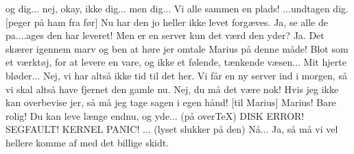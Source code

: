 \documentclass[a4paper,11pt]{article}
\begin{document}
\begin{sketch}
   og dig... nej, okay, ikke dig... men dig... Vi alle sammen en plads!
   ...undtagen dig. [peger på ham fra før]
 Nu har den jo heller ikke levet forgæves.
 Ja, se alle de pa....ages den har leveret!
 Men er en server kun det værd den yder?
 Ja.
 Det skærer igennem marv og ben at høre jer omtale Marius på denne måde!
   Blot som et værktøj, for at levere en vare, og ikke et følende, tænkende væsen...
   Mit hjerte bløder...   
 Nej, vi har altså ikke tid til det her. Vi får en ny server ind i morgen, så
    vi skal altså have fjernet den gamle nu.
 Nej, du må det være nok! Hvis jeg ikke kan overbevise jer, så må jeg
   tage sagen i egen hånd!
[til Marius] Marius! Bare rolig! Du kan leve længe endnu, og yde... 
 (på overTeX) DISK ERROR! SEGFAULT! KERNEL PANIC! ...
   (lyset slukker på den)
 Nå... Ja, så må vi vel hellere komme af med det billige skidt.

\end{sketch}
\end{document}
